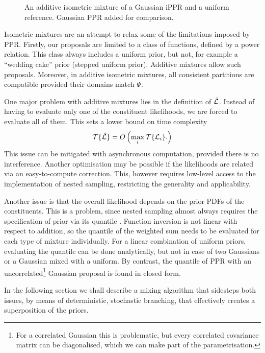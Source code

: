 \documentclass[usenatbib]{mnras}
\begin{document}
\begin{figure}
  
  \caption{\label{fig:additive} An additive isometric mixture of a
    Gaussian iPPR and a uniform reference. Gaussian PPR added for comparison.}
\end{figure}

Isometric mixtures are an attempt to relax some of the limitations
imposed by PPR. Firstly, our proposals are limited to a class of
functions, defined by a power relation. This class always includes a
uniform prior, but not, for example a ``wedding cake'' prior (stepped
uniform prior). Additive mixtures allow such proposals. Moreover, in
additive isometric mixtures, all consistent partitions are compatible
provided their domains match $\Psi$.

One major problem with additive mixtures lies in the definition of
$\hat{\cal L}$. Instead of having to evaluate only one of the
constituent likelihoods, we are forced to evaluate all of them. This
sets a lower bound on time complexity
\begin{equation}
  {\cal T}\{\hat{\cal L}\} = O \left(   \max_{i} {\cal T}\{ {\cal L}_{i}\}. \right)\label{eq:hard-cap}
\end{equation}
This issue can be mitigated with asynchronous computation, provided
there is no interference. Another optimisation may be possible if the
likelihoods are related via an easy-to-compute correction.  This,
however requires low-level access to the implementation of nested
sampling, restricting the generality and applicability. 

Another issue is that the overall likelihood depends on the prior PDFs
of the constituents. This is a problem, since nested sampling almost
always requires the specification of prior via its quantile
\cite{Skilling2006,polychord,multinest}. Function inversion is not
linear with respect to addition, so the quantile of the weighted sum
needs to be evaluated for each type of mixture individually. For a
linear combination of uniform priors, evaluating the quantile can be
done analytically, but not in case of two Gaussians or a Gaussian
mixed with a uniform. By contrast, the quantile of PPR with an
uncorrelated\footnote{For a correlated Gaussian this is problematic,
  but every correlated covariance matrix can be diagonalised, which we
  can make part of the parametrisation.} Gaussian proposal is found in
closed form.


In the following section we shall describe a mixing algorithm that
sidesteps both issues, by means of deterministic, stochastic
branching, that effectively creates a superposition of the priors.
\end{document}
